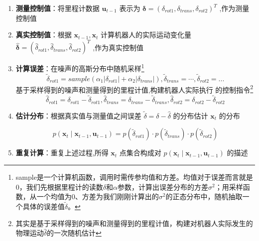 \documentclass[../main.tex]{subfiles}
\begin{document}
\begin{enumerate}
\begin{enumerate}
            \begin{enumerate}
                \item \textbf{测量控制值}：将里程计数据 \( {\mathbf{u}}_{t - 1} \) 表示为 \( \mathbf{\delta } = {\left( {\delta }_{rot1},{\delta }_{trans},{\delta }_{rot2}\right) }^{T} \) ,作为测量控制值
                \item \textbf{真实控制值}：根据 \( {\mathbf{x}}_{t - 1},{\mathbf{x}}_{t} \) 计算机器人的实际运动变化量 \( \widehat{\mathbf{\delta }} = {\left( {\widehat{\delta }}_{rot1},{\widehat{\delta }}_{trans},{\widehat{\delta }}_{rot2}\right) }^{T} \) ,作为真实控制值
                \item \textbf{计算误差}：在噪声的高斯分布中随机采样\footnote{sample是一个计算机函数，调用时需传参均值和方差。均值对于误差而言就是0，我们先根据里程计的读数$\delta$和$\alpha$参数，计算出误差分布的方差$\sigma^2$；用采样函数，从一个均值为0、方差为我们刚刚计算出的$\sigma^2$的正态分布中，随机抽取一个具体的误差值$\widetilde{\delta }$。}
                $${\widetilde{\delta }}_{rot1} = {sample}\left( {{\alpha }_{1}\left| {\delta }_{rot1}\right|  + {\alpha }_{2}\left| {\delta }_{trans}\right| }\right) ,{\widetilde{\delta }}_{trans} = \cdots ,{\widetilde{\delta }}_{rot2} = ... $$
                基于采样得到的噪声和测量得到的里程计值,构建机器人实际执行
                的控制指令\footnote{其实是基于采样得到的噪声和测量得到的里程计值，构建对机器人实际发生的物理运动$\widehat{\delta }$的一次随机估计}
                $$ {\widehat{\delta }}_{rot1} = {\delta }_{rot1} - {\widetilde{\delta }}_{rot1},{\widehat{\delta }}_{trans} = {\delta }_{trans} - {\widetilde{\delta }}_{trans},{\widehat{\delta }}_{rot2} = {\delta }_{rot2} - {\widetilde{\delta }}_{rot2} $$               
                \item \textbf{估计分布}：根据真实值与测量值之间误差 \( \widetilde{\delta } = \delta  - \widehat{\delta } \) 的分布估计 \( {\mathbf{x}}_{t} \) 的分布
                
                $$ \boxed{p\left( {{\mathbf{x}}_{t} \mid  {\mathbf{x}}_{t - 1},{\mathbf{u}}_{t - 1}}\right)  = p\left( {\widetilde{\delta }}_{rot1}\right)  \cdot  p\left( {\widetilde{\delta }}_{trans}\right)  \cdot  p\left( {\widetilde{\delta }}_{rot2}\right)} $$
                \item \textbf{重复计算}：重复上述过程,所得 \( {\mathbf{x}}_{t} \) 点集合构成对 \( p\left( {{\mathbf{x}}_{t} \mid  {\mathbf{x}}_{t - 1},{\mathbf{u}}_{t - 1}}\right) \) 的描述


\end{enumerate}
\end{enumerate}
\end{enumerate}
\end{document}
